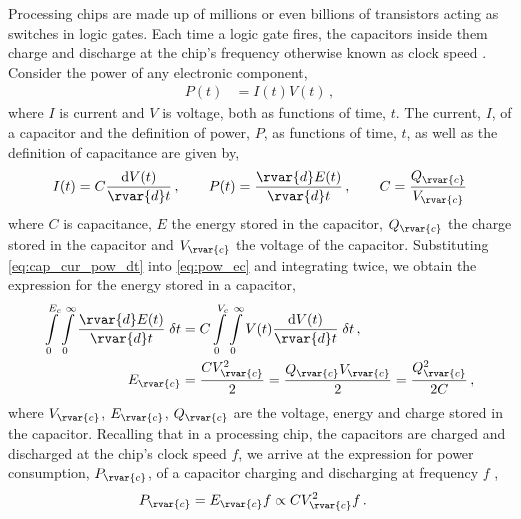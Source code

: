 Processing chips are made up of millions or even billions of transistors acting as switches in logic gates. Each time a logic gate fires, the capacitors inside them charge and discharge at the chip's frequency otherwise known as clock speed \cite{cpu_trnstor}. Consider the power of any electronic component,
\begin{align}\label{eq:pow_ec}
    P(t) & = I(t) V(t) \,,
\end{align}
where $ I $ is current and $ V $ is voltage, both as functions of time, $t$. The current, $ I $, of a capacitor and the definition of power, $ P $, as functions of time, $ t $, as well as the definition of capacitance are given by,
\begin{align}\label{eq:cap_cur_pow_dt}
    I(t) = C \dfrac{\mathrm{d}V(t)}{\rvar{d}t} \,, \qquad
    P(t) = \dfrac{\rvar{d}E(t)}{\rvar{d}t}\,, \qquad
    C = \dfrac{Q_\rvar{c}}{V_\rvar{c}}
\end{align}
where $ C $ is capacitance, $ E $ the energy stored in the capacitor, $Q_\rvar{c}$ the charge stored in the capacitor and $V_\rvar{c}$ the voltage of the capacitor. Substituting \cref{eq:cap_cur_pow_dt} into \cref{eq:pow_ec} and integrating twice, we obtain the expression for the energy stored in a capacitor,
\begin{subequations}
    \begin{align}\label{eq:e_cap}
        \int\limits_{0}^{E_{c}}\int\limits_{0}^{\infty} \dfrac{\rvar{d}E(t)}{\rvar{d}t}\; \delta t & = C \int\limits_{0}^{V_{c}}\int\limits_{0}^{\infty} V(t) \dfrac{\mathrm{d}V(t)}{\rvar{d}t}\; \delta t\,, \\
        E_{\rvar{c}}                                                                               & = \dfrac{C V_{\rvar{c}}^{2}}{2}  = \dfrac{Q_\rvar{c} V_\rvar{c}}{2} = \dfrac{Q_\rvar{c}^2}{2C}\,,
    \end{align}
\end{subequations}
where $ V_{\rvar{c}} $, $ E_{\rvar{c}} $, $Q_\rvar{c}$ are the voltage, energy and charge stored in the capacitor. Recalling that in a processing chip, the capacitors are charged and discharged at the chip's clock speed $ f $, we arrive at the expression for power consumption, $ P_{\rvar{c}} $, of a capacitor charging and discharging at frequency $ f $ \cite{microelec},
\begin{align}
    P_{\rvar{c}} & = E_{\rvar{c}} f \propto C V_{\rvar{c}}^{2} f \label{eq:p_cap}\,.
\end{align}

